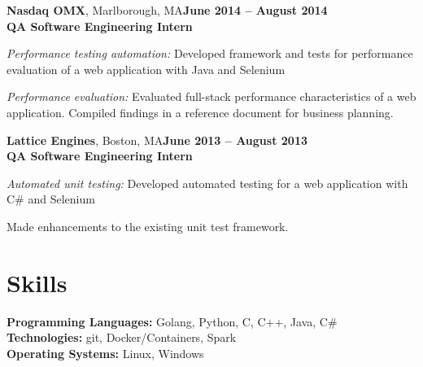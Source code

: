 \documentclass[margin,line]{resume}
\begin{document}
\begin{resume}
\textbf{Nasdaq OMX}, Marlborough, MA\hfill\textbf{June 2014 -- August 2014}\\
\textbf{QA Software Engineering Intern}\hfill 
\vspace{-3mm}\\\vspace{-1mm}
\begin{list2}
	\item \filbreak\textit{Performance testing automation:} Developed framework
    and tests for performance evaluation of a web application with Java and Selenium
	\item \filbreak\textit{Performance evaluation:} Evaluated full-stack performance characteristics of a web application. Compiled findings in a reference document for business planning.
\end{list2}

\textbf{Lattice Engines}, Boston, MA\hfill\textbf{June 2013 -- August 2013}\\
\textbf{QA Software Engineering Intern}\hfill 
\vspace{-3mm}\\\vspace{-1mm}
\begin{list2}
	\item \filbreak\textit{Automated unit testing:} Developed automated testing
    for a web application with C\# and Selenium
    \item Made enhancements to the existing unit test framework.
\end{list2}



\filbreak
\section{\mysidestyle Skills}
\textbf{Programming Languages:} Golang, Python, C, C++, Java, C\#\\
\textbf{Technologies:} git, Docker/Containers, Spark\\
\textbf{Operating Systems:} Linux, Windows



\end{resume}
\end{document}
